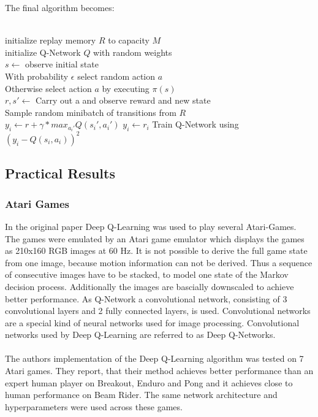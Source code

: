 The final algorithm becomes: 
\\
\\
\begin{algorithm}[H]

	initialize replay memory $R$ to capacity $M$		\\
	initialize Q-Network $Q$ with random weights		\\	
	
	 {
		$ s \leftarrow $ observe initial state					\\
		 {
			With probability $\epsilon$ select random action $a$ 		\\
			Otherwise select action $a$ by executing $\pi(s)$			\\
			$ r, s' \leftarrow $ Carry out a and observe reward and new state	\\
			Sample random minibatch of transitions from $R$			\\
			 {
				 { 
					$y_i \leftarrow r + \gamma * max_{a_i'}Q(s_i', a_i')$
				 } {
				 	$y_i \leftarrow r_i$
				 }
				 Train Q-Network using $(y_i - Q(s_i, a_i))^2$  \\
			}
		}
	}
\end{algorithm}

\subsection{Practical Results}

\subsubsection{Atari Games}

In the original paper \cite{DQN} Deep Q-Learning was used to play several Atari-Games. The games were emulated by an Atari game emulator which displays the games as 210x160 RGB images at 60 Hz. It is not possible to derive the full game state from one image, because motion information can not be derived. Thus a sequence of consecutive images have to be stacked, to model one state of the Markov decision process. Additionally the images are bascially downscaled to achieve better performance. As Q-Network a convolutional network, consisting of 3 convolutional layers and 2 fully connected layers, is used. Convolutional networks are a special kind of neural networks used for image processing. Convolutional networks used by Deep Q-Learning are referred to as Deep Q-Networks. 
\\
\\
The authors implementation of the Deep Q-Learning algorithm was tested on 7 Atari games. They report, that their method achieves better performance than an expert human player on Breakout, Enduro and Pong and it achieves close to human performance on Beam Rider. The same network architecture and hyperparameters were used across these games. 
\\

